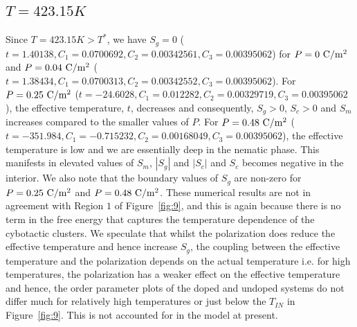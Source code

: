 \documentclass[reprint,amsfonts,amsmath,amssymb,aps,pre,floatfix,10pt]{revtex4-1}
\begin{document}
\subsection{$T = 423.15 K$}

Since $T =423.15 K > T^*$, we have $S_g = 0$ ($t =1.40138, C_1 =0.0700692, C_2 =0.00342561, C_3 =0.00395062$) for $P = 0 ~\rm{C}/\rm{m}^2$ and $P = 0.04 ~\rm{C}/\rm{m}^2$ ($t =1.38434, C_1 =0.0700313, C_2 =0.00342552, C_3 =0.00395062$).
 For $P = 0.25 ~ \rm{C}/\rm{m}^2$ ($t =-24.6028, C_1 =0.012282, C_2 =0.00329719, C_3 =0.00395062$), the effective temperature, $t$, decreases and consequently, $S_g > 0$, $S_c>0$ and $S_m$ increases compared to the smaller values of $P$.  For $P = 0.48 ~\rm{C}/\rm{m}^2$ ($t =-351.984, C_1 =-0.715232, C_2 =0.00168049, C_3 =0.00395062$), the effective temperature is low and we are essentially deep in the nematic phase. This manifests in elevated values of $S_m$, $|S_g|$ and $|S_c|$ and $S_c$ becomes negative in the interior. We also note that the boundary values of $S_g$ are non-zero for $P = 0.25 ~\rm{C}/\rm{m}^2$ and $P = 0.48 ~\rm{C}/\rm{m}^2$. These numerical results are not in agreement with Region $1$ of Figure~\ref{fig:9}, and this is again because there is no term in the free energy that captures the temperature dependence of the cybotactic clusters. We speculate that whilst the polarization does reduce the effective temperature and hence increase $S_g$, the coupling between the effective temperature and the polarization depends on the actual temperature i.e. for high temperatures, the polarization has a weaker effect on the effective temperature and hence, the order parameter plots of the doped and undoped systems do not differ much for relatively high temperatures or just below the $T_{IN}$ in Figure~\ref{fig:9}. This is not accounted for in the model at present.
\end{document}
